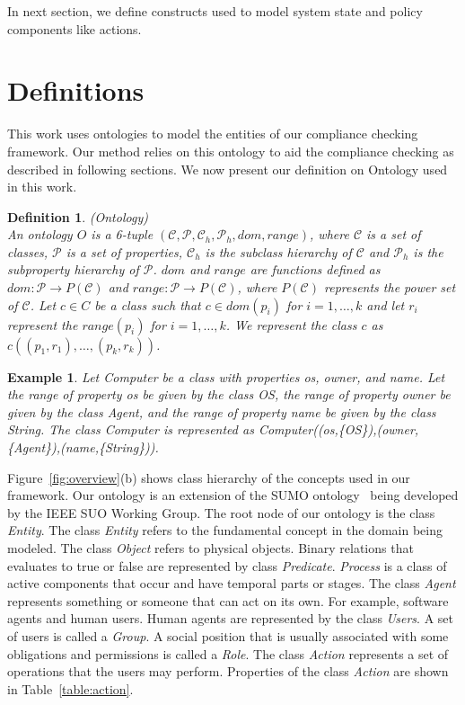\documentclass[12pt,journal,letterpaper,onecolumn]{IEEEtran}
\newtheorem{definition}{Definition}[section]
\newtheorem{example}{Example}[section]
\begin{document}
In next section, we define constructs used to model system state and
policy components like actions.

\section{Definitions}
\label{sec:definitions} This work uses ontologies to model the
entities of our compliance checking framework. Our method relies on this
ontology to aid the compliance checking as described in following
sections.  We now present our definition on Ontology used in
this work.



\begin{definition}(Ontology)\\
An ontology $O$ is a 6-tuple
$(\mathcal{C},\mathcal{P},\mathcal{C}_h,\mathcal{P}_h, dom, range)$,
where $\mathcal{C}$ is a set of classes, $\mathcal{P}$ is a set of
properties, $\mathcal{C}_h$ is the subclass hierarchy of
$\mathcal{C}$ and $\mathcal{P}_h$ is the subproperty hierarchy of
$\mathcal{P}$. $dom$ and $range$ are functions defined as
$dom:\mathcal{P}\rightarrow P(\mathcal{C})$ and
$range:\mathcal{P}\rightarrow P(\mathcal{C})$, where
$P(\mathcal{C})$ represents the power set of $\mathcal{C}$.
Let $c \in C$ be a class such that $c \in dom(p_i)$ for
$i=1,\ldots,k$ and let $r_i$ represent the $range(p_i)$ for
$i=1,\ldots,k$. We represent the class $c$ as
$c((p_1,r_1),\ldots,(p_k,r_k))$. \label{def:ontology}
\end{definition}

\begin{example} Let {\ttfamily Computer} be a class with properties {\ttfamily os}, {\ttfamily owner},
and {\ttfamily name}. Let the range of property {\ttfamily os} be
given by the class {\ttfamily OS}, the range of property {\ttfamily
owner} be given by the class {\ttfamily Agent}, and the range of
property {\ttfamily name} be given by the class {\ttfamily String}.
The class {\ttfamily Computer} is represented as {\ttfamily
Computer((os,\{OS\}),(owner,\{Agent\}),(name,\{String\}))}.
\label{eg:class}
\end{example}

Figure~\ref{fig:overview}(b) shows class hierarchy of the concepts
used in our framework. Our ontology is an extension of the SUMO
ontology~\cite{sumo} being developed by the IEEE SUO Working Group.
The root node of our ontology is the class {\em Entity}. The class
{\em Entity} refers to the fundamental concept in the domain being
modeled. The class {\em Object} refers to physical objects. Binary
relations that evaluates to true or false are represented by class
{\em Predicate}. {\em Process} is a class of active components that
occur and have temporal parts or stages. The class {\em Agent}
represents something or someone that can act on its own. For
example, software agents and human users. Human agents are
represented by the class {\em Users}. A set of users is called a
{\em Group}. A social position that is usually associated with some
obligations and permissions is called a {\em Role}. The class {\em
Action} represents a set of operations that the users may perform.
Properties of the class {\em Action} are shown in
Table~\ref{table:action}.
\end{document}

